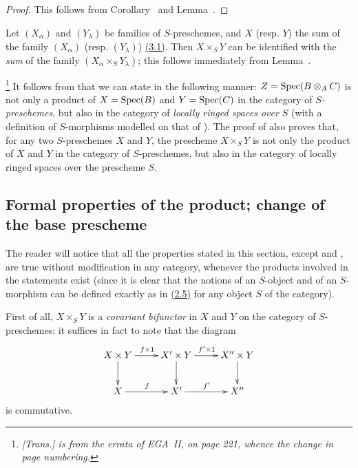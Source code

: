 \begin{proof}
This follows from Corollary~ and Lemma~.
\end{proof}

\begin{env}[3.2.8]
\label{I.3.2.8}
Let $(X_\alpha)$ and $(Y_\lambda)$ be families of $S$-preschemes, and $X$ (resp. $Y$) the sum
of the family $(X_\alpha)$ (resp. $(Y_\lambda)$) \hyperref[subsection:I.3.1]{(3.1)}.
Then $X\times_S Y$ can be identified with the \emph{sum} of the family $(X_\alpha\times_S Y_\lambda)$; this follows immediately from Lemma~.
\end{env}

\begin{env}[3.2.9]
\label{I.3.2.9}
\footnote{\emph{[Trans.]  is from the errata of EGA~II, on page 221, whence the change in page numbering.}}
It follows from  that we can state  in the following
manner: $Z=\operatorname{Spec}(B\otimes_A C)$ is not only a product of $X=\operatorname{Spec}(B)$ and $Y=\operatorname{Spec}(C)$ in the
category of \emph{$S$-preschemes}, but also in the category of \emph{locally ringed spaces
over $S$} (with a definition of $S$-morphisms modelled on that of ). The
proof of  also proves that, for any two $S$-preschemes $X$ and $Y$, the
prescheme $X\times_S Y$ is not only the product of $X$ and $Y$ in the category of
$S$-preschemes, but also in the category of locally ringed spaces over the prescheme $S$.
\end{env}

\subsection{Formal properties of the product; change of the base prescheme}
\label{subsection:I.3.3}

\begin{env}[3.3.1]
\label{I.3.3.1}
The reader will notice that all the properties stated in this section, except
 and , are true without modification in any
category, whenever the products involved in the statements exist (since it is
clear that the notions of an $S$-object and of an $S$-morphism can be defined
exactly as in \hyperref[subsection:I.2.5]{(2.5)} for any object $S$ of the category).
\end{env}

\begin{env}[3.3.2]
\label{I.3.3.2}
First of all, $X\times_S Y$ is a \emph{covariant bifunctor} in $X$ and $Y$ on the
category of $S$-preschemes: it suffices in fact to note that the diagram
\[
  \xymatrix{
    X\times Y\ar[r]^{f\times 1}\ar[d] &
    X'\times Y\ar[r]^{f'\times 1}\ar[d] &
    X''\times Y\ar[d]\\
    X\ar[r]^f &
    X'\ar[r]^{f'} &
    X''
  }
\]
is commutative.
\end{env}

